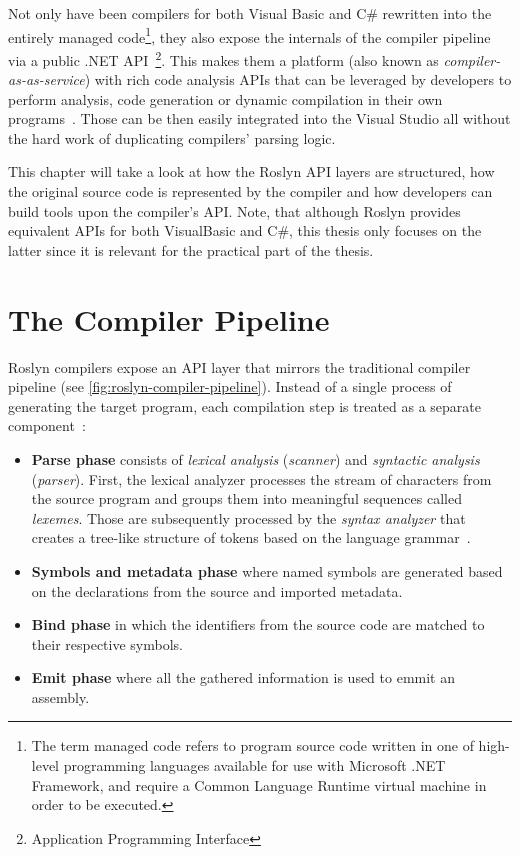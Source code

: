 \documentclass[
  digital, %
  table,   %
  lof,     %
  lot,     %
  oneside,
]{fithesis3}
\begin{document}
Not only have been compilers for both Visual Basic and C\# rewritten into the entirely managed code\footnote{The term managed code refers to program source code written in one of high-level programming languages available for use with Microsoft .NET Framework, and require a Common Language Runtime virtual machine in order to be executed.}, they also expose the internals of the compiler pipeline via a public .NET API~\footnote{Application Programming Interface}. This makes them a platform (also known as \textit{compiler-as-as-service}) with rich code analysis APIs that can be leveraged by developers to perform analysis, code generation or dynamic compilation in their own programs~\cite{roslyn-succinctly}. Those can be then easily integrated into the Visual Studio all without the hard work of duplicating compilers' parsing logic.

This chapter will take a look at how the Roslyn API layers are structured, how the original source code is represented by the compiler and how developers can build tools upon the compiler's API. Note, that although Roslyn provides equivalent APIs for both VisualBasic and C\#, this thesis only focuses on the latter since it is relevant for the practical part of the thesis.  
  
\section{The Compiler Pipeline}
Roslyn compilers expose an API layer that mirrors the traditional compiler pipeline (see \ref{fig:roslyn-compiler-pipeline}). Instead of a single process of generating the target program, each compilation step is treated as a separate component~\cite{roslyn-overview}:

\begin{itemize}
  \item \textbf{Parse phase} consists of \textit{lexical analysis} (\textit{scanner}) and \textit{syntactic analysis} (\textit{parser}). First, the lexical analyzer processes the stream of characters from the source program and groups them into meaningful sequences called \textit{lexemes}. Those are subsequently processed by the \textit{syntax analyzer} that creates a tree-like structure of tokens based on the language grammar~\cite{dragon-book}.

  \item \textbf{Symbols and metadata phase} where named symbols are generated based on the declarations from the source and imported metadata.

  \item \textbf{Bind phase} in which the identifiers from the source code are matched to their respective symbols.

  \item \textbf{Emit phase} where all the gathered information is used to emmit an assembly.
\end{itemize}
\end{document}

